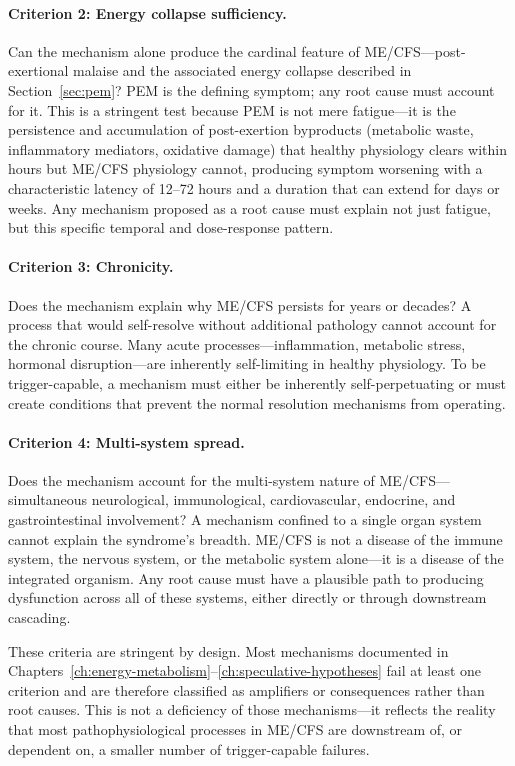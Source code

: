 \paragraph{Criterion 2: Energy collapse sufficiency.} Can the mechanism alone produce the cardinal feature of ME/CFS---post-exertional malaise and the associated energy collapse described in Section~\ref{sec:pem}? PEM is the defining symptom; any root cause must account for it. This is a stringent test because PEM is not mere fatigue---it is the persistence and accumulation of post-exertion byproducts (metabolic waste, inflammatory mediators, oxidative damage) that healthy physiology clears within hours but ME/CFS physiology cannot, producing symptom worsening with a characteristic latency of 12--72 hours and a duration that can extend for days or weeks. Any mechanism proposed as a root cause must explain not just fatigue, but this specific temporal and dose-response pattern.

\paragraph{Criterion 3: Chronicity.} Does the mechanism explain why ME/CFS persists for years or decades? A process that would self-resolve without additional pathology cannot account for the chronic course. Many acute processes---inflammation, metabolic stress, hormonal disruption---are inherently self-limiting in healthy physiology. To be trigger-capable, a mechanism must either be inherently self-perpetuating or must create conditions that prevent the normal resolution mechanisms from operating.

\paragraph{Criterion 4: Multi-system spread.} Does the mechanism account for the multi-system nature of ME/CFS---simultaneous neurological, immunological, cardiovascular, endocrine, and gastrointestinal involvement? A mechanism confined to a single organ system cannot explain the syndrome's breadth. ME/CFS is not a disease of the immune system, the nervous system, or the metabolic system alone---it is a disease of the integrated organism. Any root cause must have a plausible path to producing dysfunction across all of these systems, either directly or through downstream cascading.

These criteria are stringent by design. Most mechanisms documented in Chapters~\ref{ch:energy-metabolism}--\ref{ch:speculative-hypotheses} fail at least one criterion and are therefore classified as amplifiers or consequences rather than root causes. This is not a deficiency of those mechanisms---it reflects the reality that most pathophysiological processes in ME/CFS are downstream of, or dependent on, a smaller number of trigger-capable failures.

